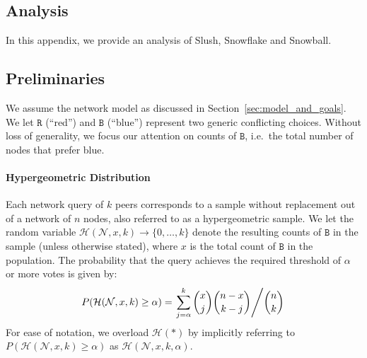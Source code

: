 \documentclass[letterpaper,twocolumn,10pt]{article}
\newcommand{\tronly}[2]{#1}
\theoremstyle{definition}
\begin{document}



\begin{appendices}
\section{Analysis}
\label{sec:full-analysis}
In this appendix, we provide an analysis of Slush, Snowflake and Snowball.

\subsection{Preliminaries}
We assume the network model as discussed in Section~\ref{sec:model_and_goals}. We let $\mathtt{R}$ (``red'') and $\mathtt{B}$ (``blue'') represent two generic conflicting choices.
Without loss of generality, we focus our attention on counts of $\mathtt{B}$, i.e.\ the total number of nodes that prefer blue.

\paragraph{Hypergeometric Distribution} Each network query of $k$ peers corresponds to a sample without replacement out of a network of $n$ nodes, also referred to as a hypergeometric sample.
We let the random variable $\mathcal{H}(\mathcal{N}, x, k) \rightarrow \{0, \dots, k\}$ denote the resulting counts of $\mathtt{B}$ in the sample (unless otherwise stated), where $x$ is the total count of $\mathtt{B}$ in the population. The probability that the query achieves the required threshold of $\alpha$ or more votes is given by:
\begin{equation}
\small
P(\mathcal{H}(\mathcal{N}, x, k) \geq \alpha) = \left.\sum_{j = \alpha}^{k} {x \choose j} {n - x \choose k - j} \middle/ {n \choose k}\right.
\label{eq:hypergeometric}
\end{equation}
For ease of notation, we overload $\mathcal{H}(*)$ by implicitly referring to $P(\mathcal{H}(\mathcal{N}, x, k) \geq \alpha)$ as $\mathcal{H}(\mathcal{N}, x, k, \alpha)$. 


\end{appendices}
\end{document}
